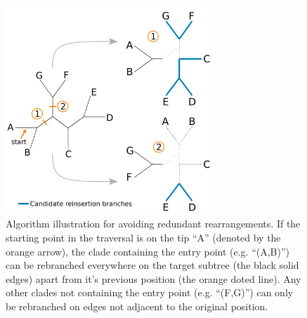 \documentclass[12pt,letterpaper]{article}
\renewcommand{\section}[1]{%
\bigskip
\begin{center}
\begin{Large}
\normalfont\scshape #1
\medskip
\end{Large}
\end{center}}
\begin{document}
\begin{figure}[!htbp]
\centering
   \includegraphics[width=0.7\textwidth]{Figure/Figure_Neighbour.pdf}
\caption{Algorithm illustration for avoiding redundant rearrangements. If the starting point in the traversal is on the tip ``A'' (denoted by the orange arrow), the clade containing the entry point (e.g. ``(A,B)'') can be rebranched everywhere on the target subtree (the black solid edges) apart from it's previous position (the orange doted line). Any other clades not containing the entry point (e.g. ``(F,G)'') can only be rebranched on edges not adjacent to the original position.}
\label{Figure_Neighbor}
\end{figure}


\end{document}

